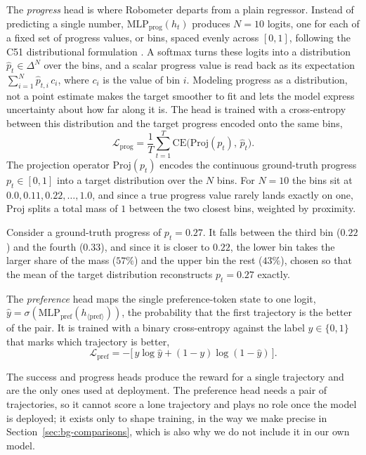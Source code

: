 The \emph{progress} head is where Robometer departs from a plain regressor. Instead of predicting a single number, $\mathrm{MLP}_{\mathrm{prog}}(h_t)$ produces $N = 10$ logits, one for each of a fixed set of progress values, or bins, spaced evenly across $[0,1]$, following the C51 distributional formulation \citep{bellemare2017c51}. A softmax turns these logits into a distribution $\hat{p}_t \in \Delta^{N}$ over the bins, and a scalar progress value is read back as its expectation $\sum_{i=1}^{N} \hat{p}_{t,i}\, c_i$, where $c_i$ is the value of bin $i$. Modeling progress as a distribution, not a point estimate makes the target smoother to fit and lets the model express uncertainty about how far along it is. The head is trained with a cross-entropy between this distribution and the target progress encoded onto the same bins,
\begin{equation}
\mathcal{L}_{\mathrm{prog}} = \frac{1}{T}\sum_{t=1}^{T} \mathrm{CE}\!\big(\mathrm{Proj}(p_t),\, \hat{p}_t\big).
\end{equation}
The projection operator $\mathrm{Proj}(p_t)$ encodes the continuous ground-truth progress $p_t \in [0,1]$ into a target distribution over the $N$ bins. For $N=10$ the bins sit at $0.0, 0.11, 0.22, \dots, 1.0$, and since a true progress value rarely lands exactly on one, $\mathrm{Proj}$ splits a total mass of $1$ between the two closest bins, weighted by proximity. 

Consider a ground-truth progress of $p_t = 0.27$. It falls between the third bin ($0.22$) and the fourth ($0.33$), and since it is closer to $0.22$, the lower bin takes the larger share of the mass ($57\%$) and the upper bin the rest ($43\%$), chosen so that the mean of the target distribution reconstructs $p_t = 0.27$ exactly.

The \emph{preference} head maps the single preference-token state to one logit, $\hat{y} = \sigma(\mathrm{MLP}_{\mathrm{pref}}(h_{\langle\mathrm{pref}\rangle}))$, the probability that the first trajectory is the better of the pair. It is trained with a binary cross-entropy against the label $y \in \{0,1\}$ that marks which trajectory is better,
\begin{equation}
\mathcal{L}_{\mathrm{pref}} = -\big[\, y\log\hat{y} + (1-y)\log(1-\hat{y}) \,\big].
\label{eq:pref-loss}
\end{equation}

The success and progress heads produce the reward for a single trajectory and are the only ones used at deployment. The preference head needs a pair of trajectories, so it cannot score a lone trajectory and plays no role once the model is deployed; it exists only to shape training, in the way we make precise in Section~\ref{sec:bg-comparisons}, which is also why we do not include it in our own model.

